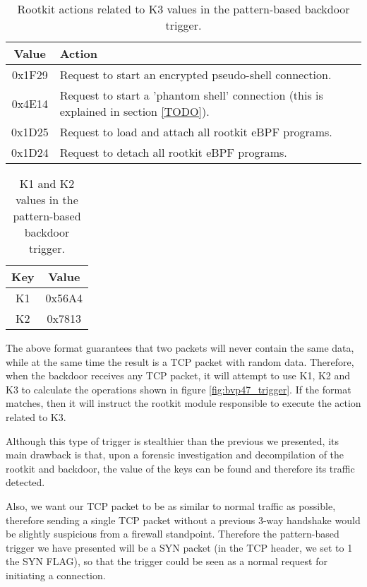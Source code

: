 \begin{table}[htbp]
\begin{tabular}{|c|>{\centering\arraybackslash}p{8cm}|}
\hline
Value & Action\\
\hline
\hline
0x1F29 & Request to start an encrypted pseudo-shell connection.\\
\hline
0x4E14 & Request to start a 'phantom shell' connection (this is explained in section \ref{TODO}).\\
\hline
0x1D25 & Request to load and attach all rootkit eBPF programs.\\
\hline
0x1D24 & Request to detach all rootkit eBPF programs.\\
\hline
\end{tabular}
\caption{Rootkit actions related to K3 values in the pattern-based backdoor trigger.}
\label{table:k3_values}
\end{table}

\begin{table}[htbp]
\begin{tabular}{|c|c|}
\hline
Key & Value\\
\hline
\hline
K1 & 0x56A4\\
\hline
K2 & 0x7813\\
\hline
\end{tabular}
\caption{K1 and K2 values in the pattern-based backdoor trigger.}
\label{table:k1_k2_values}
\end{table}

The above format guarantees that two packets will never contain the same data, while at the same time the result is a TCP packet with random data. Therefore, when the backdoor receives any TCP packet, it will attempt to use K1, K2 and K3 to calculate the operations shown in figure \ref{fig:bvp47_trigger}. If the format matches, then it will instruct the rootkit module responsible to execute the action related to K3.

Although this type of trigger is stealthier than the previous we presented, its main drawback is that, upon a forensic investigation and decompilation of the rootkit and backdoor, the value of the keys can be found and therefore its traffic detected. 

Also, we want our TCP packet to be as similar to normal traffic as possible, therefore sending a single TCP packet without a previous 3-way handshake would be slightly suspicious from a firewall standpoint. Therefore the pattern-based trigger we have presented will be a SYN packet (in the TCP header, we set to 1 the SYN FLAG), so that the trigger could be seen as a normal request for initiating a connection.

